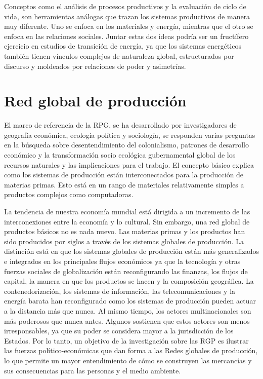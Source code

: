 \documentclass{article}
\begin{document}
Conceptos como el análisis de procesos productivos y la evaluación de ciclo de vida, son herramientas análogas que trazan los sistemas productivos de manera muy diferente. Uno se enfoca en los materiales y energía, mientras que el otro se enfoca en las relaciones sociales. Juntar estas dos ideas podría ser un fructífero ejercicio en estudios de transición de energía, ya que los sistemas energéticos también tienen vínculos complejos de naturaleza global, estructurados por discurso y moldeados por relaciones de poder y asimetrías.


\section{Red global de producción}


El marco de referencia de la RPG, se ha desarrollado por investigadores de geografía económica, ecología política y sociología, se responden varias preguntas en la búsqueda sobre desentendimiento del colonialismo, patrones de desarrollo económico y la transformación socio ecológica gubernamental global de los recursos naturales y las implicaciones para el trabajo. El concepto básico explica como los sistemas de producción están interconectados para la producción de materias primas. Esto está en un rango de materiales relativamente simples a productos complejos como computadoras.


La tendencia de nuestra economía mundial está dirigida a un incremento de las interconexiones entre la economía y lo cultural. Sin embargo, una red global de productos básicos no es nada nuevo. Las materias primas y los productos han sido producidos por siglos a través de los sistemas globales de producción. La distinción está en que los sistemas globales de producción están más generalizados e integrados en los principales flujos económicos ya que la tecnología y otras fuerzas sociales de globalización están reconfigurando las finanzas, los flujos de capital, la manera en que los productos se hacen y la composición geográfica. La contenedorización, los sistemas de información, las telecomunicaciones y la energía barata han reconfigurado como los sistemas de producción pueden actuar a la distancia más que nunca. Al mismo tiempo, los actores multinacionales son más poderosos que nunca antes. Algunos sostienen que estos actores son menos irresponsables, ya que su poder se considera mayor a la jurisdicción de los Estados. Por lo tanto, un objetivo de la investigación sobre las RGP es ilustrar las fuerzas político-económicas que dan forma a las Redes globales de producción, lo que permite un mayor entendimiento de cómo se construyen las mercancías y sus consecuencias para las personas y el medio ambiente.
\end{document}
